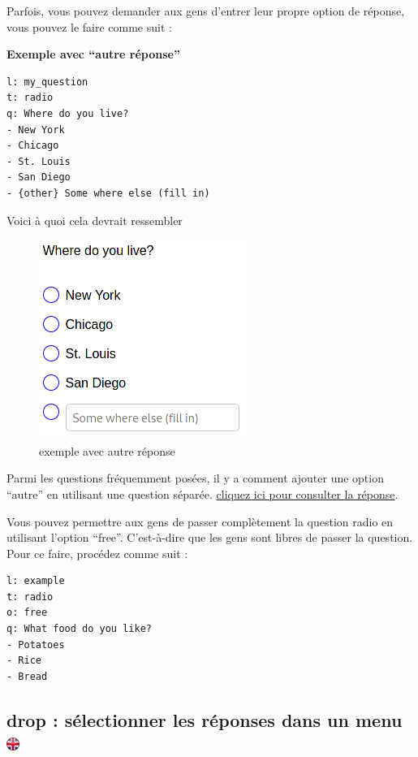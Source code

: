 \documentclass[
]{book}
\begin{document}
Parfois, vous pouvez demander aux gens d'entrer leur propre option de réponse, vous pouvez le faire comme suit :

\textbf{Exemple avec ``autre réponse''}

\begin{verbatim}
l: my_question
t: radio
q: Where do you live?
- New York
- Chicago
- St. Louis
- San Diego
- {other} Some where else (fill in)
\end{verbatim}

Voici à quoi cela devrait ressembler

\begin{figure}
\centering
\includegraphics{img/radio_other.png}
\caption{exemple avec autre réponse}
\end{figure}

Parmi les questions fréquemment posées, il y a comment ajouter une option ``autre'' en utilisant une question séparée. \href{https://www.psytoolkit.org/doc3.4.0/online-survey-syntax.html\#other}{cliquez ici pour consulter la réponse}.

Vous pouvez permettre aux gens de passer complètement la question radio en utilisant l'option ``free''. C'est-à-dire que les gens sont libres de passer la question. Pour ce faire, procédez comme suit :

\begin{verbatim}
l: example
t: radio
o: free
q: What food do you like?
- Potatoes
- Rice
- Bread
\end{verbatim}

\hypertarget{drop-suxe9lectionner-les-ruxe9ponses-dans-un-menu}{%
\subsection[drop : sélectionner les réponses dans un menu ]{\texorpdfstring{drop : sélectionner les réponses dans un menu \href{https://www.psytoolkit.org/doc3.4.0/online-survey-syntax.html\#drop}{\protect\includegraphics{img/ukflag.png}}}{drop : sélectionner les réponses dans un menu }}\label{drop-suxe9lectionner-les-ruxe9ponses-dans-un-menu}}
\end{document}
